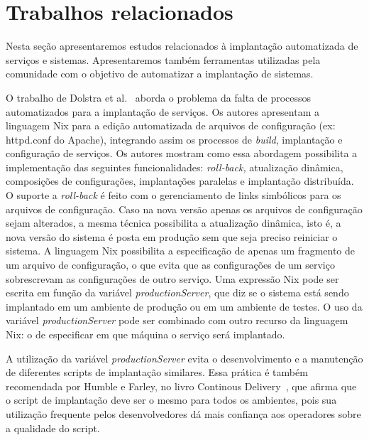 
\chapter{Trabalhos relacionados}
\label{cap:relacionados}

Nesta seção apresentaremos estudos relacionados à implantação automatizada de serviços e sistemas. Apresentaremos também ferramentas utilizadas pela comunidade com o objetivo de automatizar a implantação de sistemas.


O trabalho de Dolstra et al.~\cite{Dolstra2005Configuration} aborda o problema da falta de processos automatizados para a implantação de serviços. Os autores apresentam a linguagem Nix para a edição automatizada de arquivos de configuração (ex: httpd.conf do Apache), integrando assim os processos de \emph{build}, implantação e configuração de serviços. Os autores mostram como essa abordagem possibilita a implementação das seguintes funcionalidades: \emph{roll-back,} atualização dinâmica, composições de configurações, implantações paralelas e implantação distribuída. O suporte a \emph{roll-back} é feito com o gerenciamento de links simbólicos para os arquivos de configuração. Caso na nova versão apenas os arquivos de configuração sejam alterados, a mesma técnica possibilita a atualização dinâmica, isto é, a nova versão do sistema é posta em produção sem que seja preciso reiniciar o sistema. A linguagem Nix possibilita a especificação de apenas um fragmento de um arquivo de configuração, o que evita que as configurações de um serviço sobrescrevam as configurações de outro serviço. Uma expressão Nix pode ser escrita em função da variável \emph{productionServer}, que diz se o sistema está sendo implantado em um ambiente de produção ou em um ambiente de testes. O uso da variável \emph{productionServer} pode ser combinado com outro recurso da linguagem Nix: o de especificar em que máquina o serviço será implantado.

A utilização da variável \emph{productionServer} evita o desenvolvimento e a manutenção de diferentes scripts de implantação similares. Essa prática é também recomendada por Humble e Farley, no livro Continous Delivery~\cite{Humble2011Continuous}, que afirma que o script de implantação deve ser o mesmo para todos os ambientes, pois sua utilização frequente pelos desenvolvedores dá mais confiança aos operadores sobre a qualidade do script.

